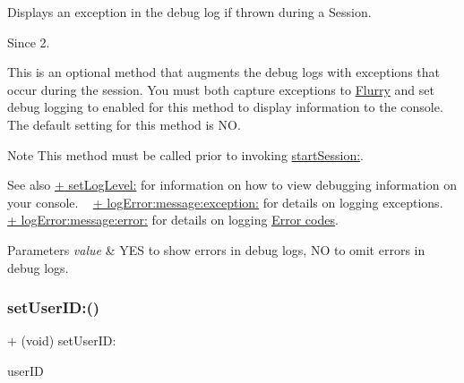 Displays an exception in the debug log if thrown during a Session. 

\begin{DoxySince}{Since}
2.
\end{DoxySince}
This is an optional method that augments the debug logs with exceptions that occur during the session. You must both capture exceptions to \hyperlink{interfaceFlurry}{Flurry} and set debug logging to enabled for this method to display information to the console. The default setting for this method is {\ttfamily NO}.

\begin{DoxyNote}{Note}
This method must be called prior to invoking \hyperlink{interfaceFlurry_aeadfa23545c392ffd46db448b6a95809}{start\+Session\+:}.
\end{DoxyNote}
\begin{DoxySeeAlso}{See also}
\hyperlink{interfaceFlurry_ab717465e705b23c80253dddae321f5bc}{+ set\+Log\+Level\+:} for information on how to view debugging information on your console. ~\newline
\hyperlink{interfaceFlurry_aab0b2c1426b3a120e54613fd47e6719e}{+ log\+Error\+:message\+:exception\+:} for details on logging exceptions. ~\newline
\hyperlink{interfaceFlurry_a54e3619abb7f17c9b2a8f01c33cdfd81}{+ log\+Error\+:message\+:error\+:} for details on logging \hyperlink{group__errors}{Error codes}.
\end{DoxySeeAlso}

\begin{DoxyParams}{Parameters}
{\em value} & {\ttfamily Y\+ES} to show errors in debug logs, {\ttfamily NO} to omit errors in debug logs. \\
\hline
\end{DoxyParams}
\mbox{\label{interfaceFlurry_a7f1e93aa12021d864af31e327ea368e0}} 
\subsubsection{\texorpdfstring{set\+User\+I\+D\+:()}{setUserID:()}}
{\footnotesize\ttfamily + (void) set\+User\+I\+D\+: \begin{DoxyParamCaption}\item[{(N\+S\+String $\ast$)}]{user\+ID }\end{DoxyParamCaption}}



